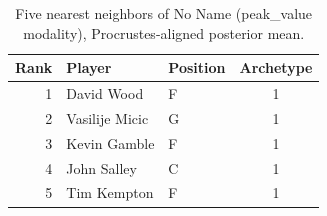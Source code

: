 \begin{table}[htbp]
  \centering\small
  \begin{tabular}{rllc}
    \toprule
    Rank & Player & Position & Archetype \\
    \midrule
    1 & David Wood & F & 1 \\
    2 & Vasilije Micic & G & 1 \\
    3 & Kevin Gamble & F & 1 \\
    4 & John Salley & C & 1 \\
    5 & Tim Kempton & F & 1 \\
    \bottomrule
  \end{tabular}
  \caption{Five nearest neighbors of No Name (peak_value modality), Procrustes-aligned posterior mean.}
  \label{tab:No_Name_neighbors_peak_value}
\end{table}


